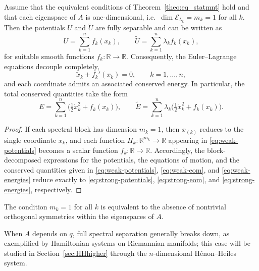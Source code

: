 \documentclass{rendiconti}
\begin{document}
\begin{theorem}
\label{th:strong}
Assume that the equivalent conditions of Theorem~\ref{theo:eq_statmnt} hold and
that each eigenspace of $A$ is one-dimensional, i.e.\ $\dim \mathcal{E}_{\lambda_k}=m_k=1$
for all $k$. Then the potentials $U$ and $\widetilde U$ are fully separable and
can be written as
\begin{equation}
\label{eq:strong-potentials}
U = \sum_{k=1}^n f_k(x_k),
\qquad
\widetilde U = \sum_{k=1}^n \lambda_k f_k(x_k),
\end{equation}
for suitable smooth functions $f_k:\mathbb{R}\to\mathbb{R}$. Consequently, the
Euler--Lagrange equations decouple completely,
\begin{equation}
\label{eq:strong-eom}
\ddot x_k + f_k'(x_k) = 0,
\qquad k=1,\dots,n,
\end{equation}
and each coordinate admits an associated conserved energy. In particular, the
total conserved quantities take the form
\begin{equation}
\label{eq:strong-energies}
E = \sum_{k=1}^n\!\Big(\tfrac12 \dot x_k^2 + f_k(x_k)\Big),
\qquad
\widetilde E = \sum_{k=1}^n \lambda_k\Big(\tfrac12 \dot x_k^2 + f_k(x_k)\Big).
\end{equation}
\end{theorem}
%
\begin{proof}
If each spectral block has dimension $m_k=1$, then $x_{(k)}$ reduces to the single
coordinate $x_k$, and each function
$H_k:\mathbb{R}^{m_k}\to\mathbb{R}$ appearing in
\eqref{eq:weak-potentials} becomes a scalar function
$f_k:\mathbb{R}\to\mathbb{R}$. Accordingly, the block-decomposed expressions for
the potentials, the equations of motion, and the conserved quantities given in
\eqref{eq:weak-potentials}, \eqref{eq:weak-eom}, and \eqref{eq:weak-energies}
reduce exactly to
\eqref{eq:strong-potentials}, \eqref{eq:strong-eom}, and
\eqref{eq:strong-energies}, respectively.
\end{proof}
%
\begin{remark}
The condition $m_k=1$ for all $k$ is equivalent to the absence of nontrivial
orthogonal symmetries within the eigenspaces of $A$.
\end{remark}
\begin{remark}
When $A$ depends on $q$, full spectral separation generally breaks down, as
exemplified by Hamiltonian systems on Riemannian manifolds; this case will be
studied in Section~\ref{sec:HHhigher} through the $n$-dimensional H\'enon--Heiles
system.
\end{remark}
\end{document}
